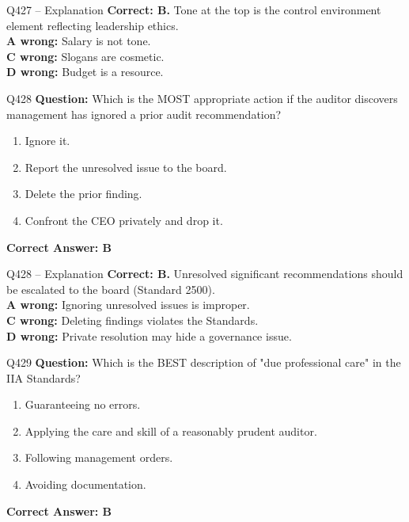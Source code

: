 \documentclass[aspectratio=169,10pt]{beamer}
\begin{document}
	\begin{frame}[t]{Q427 -- Explanation}
		\small
		\textbf{Correct: B.} Tone at the top is the control environment element reflecting leadership ethics. \\[4pt]
		\textbf{A wrong:} Salary is not tone. \\[2pt]
		\textbf{C wrong:} Slogans are cosmetic. \\[2pt]
		\textbf{D wrong:} Budget is a resource.
	\end{frame}
	
	\begin{frame}[t]{Q428}
		\small
		\textbf{Question:} Which is the MOST appropriate action if the auditor discovers management has ignored a prior audit recommendation?
		\begin{enumerate}[label=\Alph*.,itemsep=1pt,topsep=2pt]
			\item Ignore it.
			\item Report the unresolved issue to the board.
			\item Delete the prior finding.
			\item Confront the CEO privately and drop it.
		\end{enumerate}
		\vspace{4pt}
		\textbf{Correct Answer: B}
	\end{frame}
	
	\begin{frame}[t]{Q428 -- Explanation}
		\small
		\textbf{Correct: B.} Unresolved significant recommendations should be escalated to the board (Standard 2500). \\[4pt]
		\textbf{A wrong:} Ignoring unresolved issues is improper. \\[2pt]
		\textbf{C wrong:} Deleting findings violates the Standards. \\[2pt]
		\textbf{D wrong:} Private resolution may hide a governance issue.
	\end{frame}
	
	\begin{frame}[t]{Q429}
		\small
		\textbf{Question:} Which is the BEST description of "due professional care" in the IIA Standards?
		\begin{enumerate}[label=\Alph*.,itemsep=1pt,topsep=2pt]
			\item Guaranteeing no errors.
			\item Applying the care and skill of a reasonably prudent auditor.
			\item Following management orders.
			\item Avoiding documentation.
		\end{enumerate}
		\vspace{4pt}
		\textbf{Correct Answer: B}
	\end{frame}
	
\end{document}
